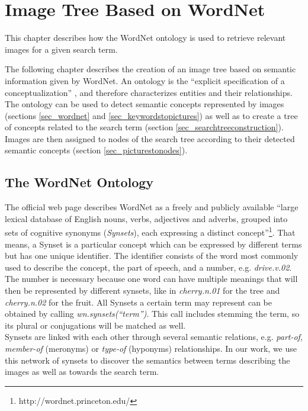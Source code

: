 %
\section{Image Tree Based on WordNet}
\label{sec_wordnetsearchtree}
This chapter describes how the WordNet ontology is used to retrieve relevant images for a given search term.

The following chapter describes the creation of an image tree based on semantic information given by WordNet. An ontology is the ``explicit specification of a conceptualization'' \cite{gruber1995ontology}, and therefore characterizes entities and their relationships. The ontology can be used to detect semantic concepts represented by images (sections \ref{sec_wordnet} and \ref{sec_keywordstopictures}) as well as to create a tree of concepts related to the search term (section \ref{sec_searchtreeconstruction}). Images are then assigned to nodes of the search tree according to their detected semantic concepts (section \ref{sec_picturestonodes}).

\subsection{The WordNet Ontology}
\label{sec_wordnet}
The official web page describes WordNet as a freely and publicly available ``large lexical database of English nouns, verbs, adjectives and adverbs, grouped into sets of cognitive synonyms (\emph{Synsets}), each expressing a distinct concept''\footnote{http://wordnet.princeton.edu/}. That means, a Synset is a particular concept which can be expressed by different terms but has one unique identifier. The identifier consists of the word most commonly used to describe the concept, the part of speech, and a number, e.g. \emph{drive.v.02}.\\
The number is necessary because one word can have multiple meanings that will then be represented by different synsets, like in \emph{cherry.n.01} for the tree and \emph{cherry.n.02} for the fruit. All Synsets a certain term may represent can be obtained by calling \emph{wn.synsets(``term'')}. This call includes stemming the term, so its plural or conjugations will be matched as well.\\

Synsets are linked with each other through several semantic relations, e.g. \emph{part-of}, \emph{member-of} (meronyms) or \emph{type-of} (hyponyms) relationships.
In our work, we use this network of synsets to discover the semantics between terms describing the images as well as towards the search term. \\

